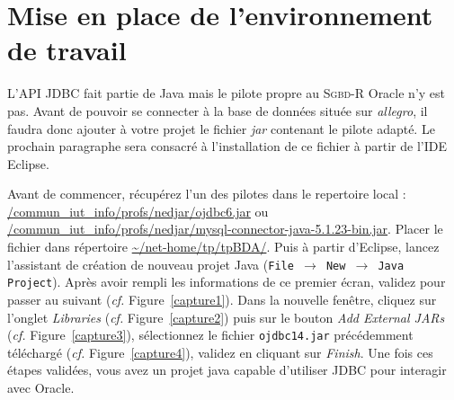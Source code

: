\documentclass{article}
\begin{document}
\section{Mise en place de l'environnement de travail}

L'API JDBC fait partie de Java mais le pilote propre au \textsc{Sgbd-R} Oracle n'y est pas. Avant de pouvoir se connecter à la base de données située sur \emph{allegro}, il faudra donc ajouter à votre projet le fichier \emph{jar} contenant le pilote adapté. Le prochain paragraphe sera consacré à l'installation de ce fichier à partir de l'IDE Eclipse.

Avant de commencer, récupérez l'un des pilotes dans le repertoire local : \url{/commun\_iut\_info/profs/nedjar/ojdbc6.jar} ou \url{/commun\_iut\_info/profs/nedjar/mysql-connector-java-5.1.23-bin.jar}. Placer le fichier dans répertoire \url{~/net-home/tp/tpBDA/}. Puis à partir d'Eclipse, lancez l'assistant de création de nouveau projet Java (\texttt{File $\rightarrow$ New $\rightarrow$ Java Project}). Après avoir rempli les informations de ce premier écran, validez pour passer au suivant (\emph{cf.} Figure~\ref{capture1}). Dans la nouvelle fenêtre, cliquez sur l'onglet \emph{Libraries} (\emph{cf.} Figure~\ref{capture2}) puis sur le bouton \emph{Add External JARs} (\emph{cf.} Figure~\ref{capture3}), sélectionnez le fichier \texttt{ojdbc14.jar} précédemment téléchargé (\emph{cf.} Figure~\ref{capture4}), validez en cliquant sur \emph{Finish}. Une fois ces étapes validées, vous avez un projet java capable d'utiliser JDBC pour interagir avec Oracle.
\end{document}
